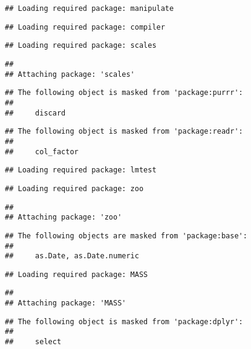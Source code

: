 \documentclass[]{article}
\begin{document}
\begin{verbatim}
## Loading required package: manipulate
\end{verbatim}

\begin{verbatim}
## Loading required package: compiler
\end{verbatim}

\begin{verbatim}
## Loading required package: scales
\end{verbatim}

\begin{verbatim}
## 
## Attaching package: 'scales'
\end{verbatim}

\begin{verbatim}
## The following object is masked from 'package:purrr':
## 
##     discard
\end{verbatim}

\begin{verbatim}
## The following object is masked from 'package:readr':
## 
##     col_factor
\end{verbatim}

\begin{verbatim}
## Loading required package: lmtest
\end{verbatim}

\begin{verbatim}
## Loading required package: zoo
\end{verbatim}

\begin{verbatim}
## 
## Attaching package: 'zoo'
\end{verbatim}

\begin{verbatim}
## The following objects are masked from 'package:base':
## 
##     as.Date, as.Date.numeric
\end{verbatim}

\begin{verbatim}
## Loading required package: MASS
\end{verbatim}

\begin{verbatim}
## 
## Attaching package: 'MASS'
\end{verbatim}

\begin{verbatim}
## The following object is masked from 'package:dplyr':
## 
##     select
\end{verbatim}
\end{document}
